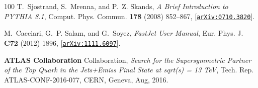 \documentclass[11pt]{article}
\renewcommand{\[}{\begin{equation}}
\renewcommand{\]}{\end{equation}}
\begin{document}
\begin{thebibliography}{100}
T.~Sjostrand, S.~Mrenna, and P.~Z. Skands, {\it {A Brief Introduction to PYTHIA
  8.1}},  Comput. Phys. Commun. {\bf 178} (2008) 852--867,
  [\href{http://xxx.lanl.gov/abs/0710.3820}{{\tt arXiv:0710.3820}}].

M.~Cacciari, G.~P. Salam, and G.~Soyez, {\it {FastJet User Manual}},  Eur.
  Phys. J. {\bf C72} (2012) 1896,
  [\href{http://xxx.lanl.gov/abs/1111.6097}{{\tt arXiv:1111.6097}}].

{\bf ATLAS Collaboration} Collaboration, {\it {Search for the Supersymmetric
  Partner of the Top Quark in the Jets+Emiss Final State at sqrt(s) = 13 TeV}},
   Tech. Rep. ATLAS-CONF-2016-077, CERN, Geneva, Aug, 2016.

\end{thebibliography}\endgroup
\end{document}

